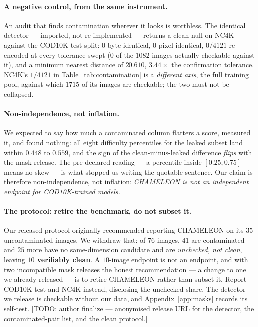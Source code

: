 \documentclass{article} %
\begin{document}
\paragraph{A negative control, from the same instrument.} An audit that finds contamination wherever
it looks is worthless. The identical detector --- imported, not re-implemented --- returns a clean null on NC4K against the
COD10K test split: $0$ byte-identical, $0$ pixel-identical, $0/4121$ re-encoded at every tolerance
swept ($0$ of the $1082$ images actually checkable against it), and a minimum nearest distance of
$20.610$, $3.44\times$ the confirmation tolerance. NC4K's $1/4121$
in Table~\ref{tab:contamination} is a \emph{different axis}, the full training pool, against which
$1715$ of its images are checkable; the two must not be collapsed.

\paragraph{Non-independence, not inflation.} We expected to say how much a contaminated column
flatters a score, measured it, and found nothing: all eight difficulty percentiles for the leaked
subset land within $0.448$ to $0.559$, and the sign of the clean-minus-leaked difference
\emph{flips} with the mask release. The pre-declared reading --- a percentile inside $[0.25,0.75]$
means no skew --- is what stopped us writing the quotable sentence. Our claim is therefore
non-independence, not inflation: \emph{CHAMELEON is not an independent endpoint for COD10K-trained
models.}

\paragraph{The protocol: retire the benchmark, do not subset it.} Our released protocol originally recommended reporting CHAMELEON on its $35$ uncontaminated images.
We withdraw that: of $76$ images, $41$ are contaminated and $25$ more have no same-dimension
candidate and are \emph{unchecked, not clean}, leaving \textbf{$10$ verifiably clean}. A $10$-image endpoint is not an endpoint, and with two incompatible mask releases the honest
recommendation --- a change to one we already released --- is to retire CHAMELEON rather than subset
it. Report COD10K-test and NC4K instead, disclosing the unchecked share. The detector we release is checkable without our data, and
Appendix~\ref{app:masks} records its self-test. [TODO: author finalize ---
anonymised release URL for the detector, the contaminated-pair list, and the clean protocol.]
\end{document}

